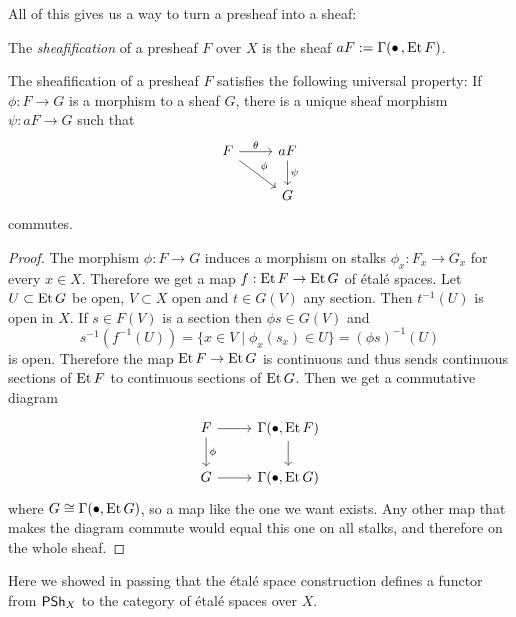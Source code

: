 All of this gives us a way to turn a presheaf into a sheaf:

\begin{defi}
The \emph{sheafification} of a presheaf $F$ over $X$ is the sheaf $aF := \Gamma(\bullet\,, \operatorname{Et} F)$.
\end{defi}


\begin{prop}
The sheafification of a presheaf $F$ satisfies the following universal property:
If $\phi : F \to G$ is a morphism to a sheaf $G$, there is a unique sheaf morphism $\psi : aF \to G$ such that
\[
\begin{tikzcd}
F \ar[rd,"\phi"] \ar[r,"\theta"] &
aF \ar[d,"\psi"] \\
& G
\end{tikzcd}
\]
commutes.
\end{prop}

\begin{proof}
The morphism $\phi : F \to G$ induces a morphism on stalks $\phi_x : F_x \to G_x$ for every $x \in X$.
Therefore we get a map $f : \operatorname{Et} F \to \operatorname{Et} G$ of \'etal\'e spaces.
Let $U \subset \operatorname{Et} G$ be open, $V \subset X$ open and $t \in G(V)$ any section.
Then $t^{-1}(U)$ is open in $X$.
If $s \in F(V)$ is a section then $\phi s \in G(V)$ and
\[
s^{-1}(f^{-1}(U))
= \{ 
x \in V \mid
\phi_x(s_x) \in U
\}
= (\phi s)^{-1}(U)
\]
is open.
Therefore the map $\operatorname{Et} F \to \operatorname{Et} G$ is continuous and thus sends continuous sections of $\operatorname{Et} F$ to continuous sections of $\operatorname{Et} G$.
Then we get a commutative diagram
\[
\begin{tikzcd}
F \ar[d,"\phi"] \ar[r] &
\Gamma(\bullet, \et F) \ar[d] \\
G \ar[r] & 
\Gamma(\bullet, \et G)
\end{tikzcd}
\]
where $G \cong \Gamma(\bullet, \operatorname{Et} G)$, so a map like the one we want exists.
Any other map that makes the diagram commute would equal this one on all stalks, and therefore on the whole sheaf.
\end{proof}

Here we showed in passing that the \'etal\'e space construction defines a functor from $\mathsf{PSh}_X$ to the category of \'etal\'e spaces over $X$.




